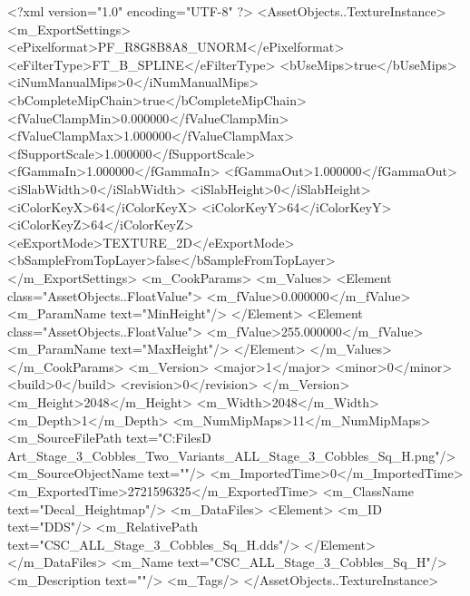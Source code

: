 <?xml version="1.0" encoding="UTF-8" ?>
<AssetObjects..TextureInstance>
	<m_ExportSettings>
		<ePixelformat>PF_R8G8B8A8_UNORM</ePixelformat>
		<eFilterType>FT_B_SPLINE</eFilterType>
		<bUseMips>true</bUseMips>
		<iNumManualMips>0</iNumManualMips>
		<bCompleteMipChain>true</bCompleteMipChain>
		<fValueClampMin>0.000000</fValueClampMin>
		<fValueClampMax>1.000000</fValueClampMax>
		<fSupportScale>1.000000</fSupportScale>
		<fGammaIn>1.000000</fGammaIn>
		<fGammaOut>1.000000</fGammaOut>
		<iSlabWidth>0</iSlabWidth>
		<iSlabHeight>0</iSlabHeight>
		<iColorKeyX>64</iColorKeyX>
		<iColorKeyY>64</iColorKeyY>
		<iColorKeyZ>64</iColorKeyZ>
		<eExportMode>TEXTURE_2D</eExportMode>
		<bSampleFromTopLayer>false</bSampleFromTopLayer>
	</m_ExportSettings>
	<m_CookParams>
		<m_Values>
			<Element class="AssetObjects..FloatValue">
				<m_fValue>0.000000</m_fValue>
				<m_ParamName text="MinHeight"/>
			</Element>
			<Element class="AssetObjects..FloatValue">
				<m_fValue>255.000000</m_fValue>
				<m_ParamName text="MaxHeight"/>
			</Element>
		</m_Values>
	</m_CookParams>
	<m_Version>
		<major>1</major>
		<minor>0</minor>
		<build>0</build>
		<revision>0</revision>
	</m_Version>
	<m_Height>2048</m_Height>
	<m_Width>2048</m_Width>
	<m_Depth>1</m_Depth>
	<m_NumMipMaps>11</m_NumMipMaps>
	<m_SourceFilePath text="C:\Users\Shadow\Desktop\Working Files\3D Art\Decals\CSC_Stage_3_Cobbles_Two_Variants\square\textures\CSC_ALL_Stage_3_Cobbles_Sq_H.png"/>
	<m_SourceObjectName text=""/>
	<m_ImportedTime>0</m_ImportedTime>
	<m_ExportedTime>2721596325</m_ExportedTime>
	<m_ClassName text="Decal_Heightmap"/>
	<m_DataFiles>
		<Element>
			<m_ID text="DDS"/>
			<m_RelativePath text="CSC_ALL_Stage_3_Cobbles_Sq_H.dds"/>
		</Element>
	</m_DataFiles>
	<m_Name text="CSC_ALL_Stage_3_Cobbles_Sq_H"/>
	<m_Description text=""/>
	<m_Tags/>
</AssetObjects..TextureInstance>

